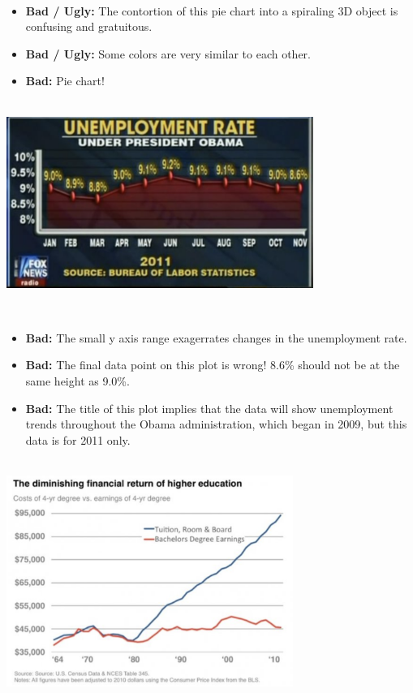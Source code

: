 \documentclass[]{book}
\providecommand{\tightlist}{%
  \setlength{\itemsep}{0pt}\setlength{\parskip}{0pt}}
\begin{document}
~

\begin{itemize}
\tightlist
\item
  \textbf{Bad / Ugly:} The contortion of this pie chart into a spiraling 3D object is confusing and gratuitous.
\item
  \textbf{Bad / Ugly:} Some colors are very similar to each other.\\
\item
  \textbf{Bad:} Pie chart!
\end{itemize}

~\\

\includegraphics[width=0.75\textwidth,height=\textheight]{img/vis16.png}

~

\begin{itemize}
\tightlist
\item
  \textbf{Bad:} The small y axis range exagerrates changes in the unemployment rate.
\item
  \textbf{Bad:} The final data point on this plot is wrong! 8.6\% should not be at the same height as 9.0\%.
\item
  \textbf{Bad:} The title of this plot implies that the data will show unemployment trends throughout the Obama administration, which began in 2009, but this data is for 2011 only.
\end{itemize}

~\\

\includegraphics[width=0.7\textwidth,height=\textheight]{img/vis18.png}
\end{document}
